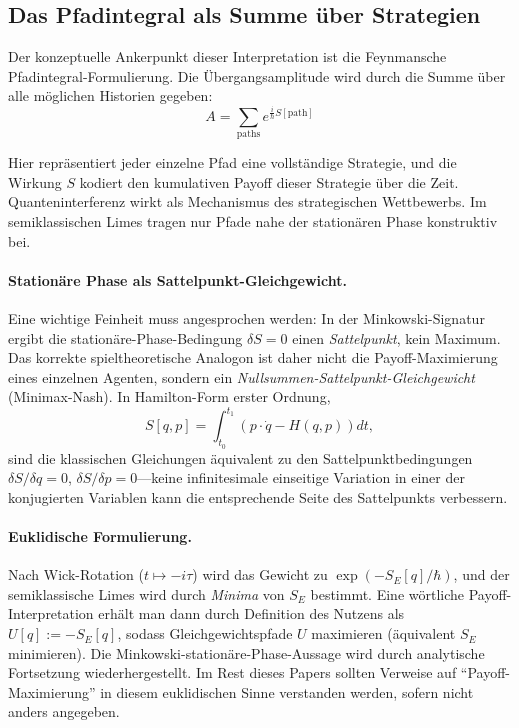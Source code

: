 \documentclass[12pt,a4paper]{article}
\theoremstyle{remark}
\begin{document}
\subsection{Das Pfadintegral als Summe \"uber Strategien}

Der konzeptuelle Ankerpunkt dieser Interpretation ist die Feynmansche Pfadintegral-Formulierung. Die \"Ubergangsamplitude wird durch die Summe \"uber alle m\"oglichen Historien gegeben:
\begin{equation}
A = \sum_{\text{paths}} e^{\frac{i}{\hbar} S[\text{path}]}
\end{equation}

Hier repr\"asentiert jeder einzelne Pfad eine vollst\"andige Strategie, und die Wirkung $S$ kodiert den kumulativen Payoff dieser Strategie \"uber die Zeit. Quanteninterferenz wirkt als Mechanismus des strategischen Wettbewerbs. Im semiklassischen Limes tragen nur Pfade nahe der station\"aren Phase konstruktiv bei.

\paragraph{Station\"are Phase als Sattelpunkt-Gleichgewicht.}
Eine wichtige Feinheit muss angesprochen werden: In der Minkowski-Signatur ergibt die station\"are-Phase-Bedingung $\delta S = 0$ einen \emph{Sattelpunkt}, kein Maximum. Das korrekte spieltheoretische Analogon ist daher nicht die Payoff-Maximierung eines einzelnen Agenten, sondern ein \emph{Nullsummen-Sattelpunkt-Gleichgewicht} (Minimax-Nash). In Hamilton-Form erster Ordnung,
\begin{equation}
S[q,p] = \int_{t_0}^{t_1} \left( p \cdot \dot{q} - H(q,p) \right) dt,
\end{equation}
sind die klassischen Gleichungen \"aquivalent zu den Sattelpunktbedingungen $\delta S / \delta q = 0$, $\delta S / \delta p = 0$---keine infinitesimale einseitige Variation in einer der konjugierten Variablen kann die entsprechende Seite des Sattelpunkts verbessern.

\paragraph{Euklidische Formulierung.}
Nach Wick-Rotation ($t \mapsto -i\tau$) wird das Gewicht zu $\exp(-S_E[q]/\hbar)$, und der semiklassische Limes wird durch \emph{Minima} von $S_E$ bestimmt. Eine w\"ortliche Payoff-Interpretation erh\"alt man dann durch Definition des Nutzens als $U[q] := -S_E[q]$, sodass Gleichgewichtspfade $U$ maximieren (\"aquivalent $S_E$ minimieren). Die Minkowski-station\"are-Phase-Aussage wird durch analytische Fortsetzung wiederhergestellt. Im Rest dieses Papers sollten Verweise auf ``Payoff-Maximierung'' in diesem euklidischen Sinne verstanden werden, sofern nicht anders angegeben.
\end{document}
